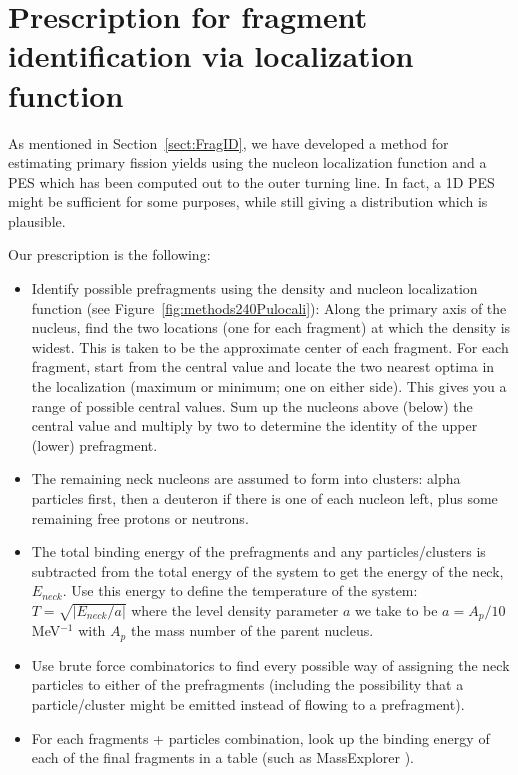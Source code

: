 \chapter{Prescription for fragment identification via localization function}\label{append:Fragments}
As mentioned in Section~\ref{sect:FragID}, we have developed a method for estimating primary fission yields using the nucleon localization function and a PES which has been computed out to the outer turning line. In fact, a 1D PES might be sufficient for some purposes, while still giving a distribution which is plausible.

Our prescription is the following:

\begin{itemize}
	\item Identify possible prefragments using the density and nucleon localization function (see Figure~\ref{fig:methods240Pulocali}):
	\subitem Along the primary axis of the nucleus, find the two locations (one for each fragment) at which the density is widest. This is taken to be the approximate center of each fragment.
	\subitem For each fragment, start from the central value and locate the two nearest optima in the localization (maximum or minimum; one on either side). This gives you a range of possible central values.
	\subitem Sum up the nucleons above (below) the central value and multiply by two to determine the identity of the upper (lower) prefragment.
	\item The remaining neck nucleons are assumed to form into clusters: alpha particles first, then a deuteron if there is one of each nucleon left, plus some remaining free protons or neutrons.
	\item The total binding energy of the prefragments and any particles/clusters is subtracted from the total energy of the system to get the energy of the neck, $E_{neck}$.
	\subitem Use this energy to define the temperature of the system: $T = \sqrt{\left|E_{neck}/a\right|}$ where the level density parameter $a$ we take to be $a=A_p/10$ MeV$^{-1}$ with $A_p$ the mass number of the parent nucleus.
	\item Use brute force combinatorics to find every possible way of assigning the neck particles to either of the prefragments (including the possibility that a particle/cluster might be emitted instead of flowing to a prefragment).
	\item For each fragments + particles combination, look up the binding energy of each of the final fragments in a table (such as  MassExplorer \cite{massexplorer}).

\end{itemize}
